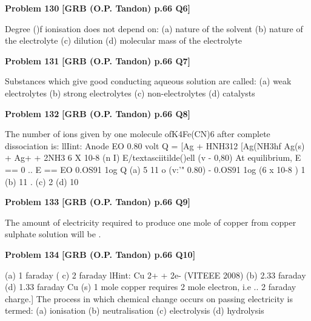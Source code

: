 \begin{problembox}
\textbf{Problem 130} \hfill \textbf{[GRB (O.P. Tandon) p.66 Q6]}
\label{q:ext-grb_all_questions-130}

Degree ()f ionisation does not depend on: 
(a) nature of the solvent 
(b) nature of the electrolyte 
(c) dilution 
(d) molecular mass of the electrolyte
\end{problembox}

\begin{problembox}
\textbf{Problem 131} \hfill \textbf{[GRB (O.P. Tandon) p.66 Q7]}
\label{q:ext-grb_all_questions-131}

Substances which give good conducting aqueous solution are 
called: 
(a) weak electrolytes 
(b) strong electrolytes 
(c) non-electrolytes 
(d) catalysts
\end{problembox}

\begin{problembox}
\textbf{Problem 132} \hfill \textbf{[GRB (O.P. Tandon) p.66 Q8]}
\label{q:ext-grb_all_questions-132}

The number of ions given by one molecule ofK4Fe(CN)6 after 
complete dissociation is: 
llIint: 
Anode 
EO 
0.80 volt 
Q = [Ag + HNH312 
[Ag(NH3hf 
Ag(s) + Ag+ + 2NH3 
6 X 10-8 
(n 
I) 
E/textasciitilde()ell 
(v - 0,80) 
At equilibrium, E == 0 
.. 
E == EO \underline{\hspace{1cm}} 0.OS91 1og Q 
(a) 5 
11 
o (v:'" 0.80) - 0.OS91 1og (6 x 10-8 ) 
1 
(b) 11 
. (c) 2 
(d) 10
\end{problembox}

\begin{problembox}
\textbf{Problem 133} \hfill \textbf{[GRB (O.P. Tandon) p.66 Q9]}
\label{q:ext-grb_all_questions-133}

The amount of electricity required to produce one mole of 
copper from copper sulphate solution will be .
\end{problembox}

\begin{problembox}
\textbf{Problem 134} \hfill \textbf{[GRB (O.P. Tandon) p.66 Q10]}
\label{q:ext-grb_all_questions-134}

(a) 1 faraday 
( c) 2 faraday 
lHint: Cu 2+ + 2e-
(VITEEE 2008) 
(b) 2.33 faraday 
(d) 1.33 faraday 
Cu (s) 
1 mole copper requires 2 mole electron, i.e .. 2 faraday charge.] 
The process in which chemical change occurs on passing 
electricity is termed: 
(a) ionisation 
(b) neutralisation 
(c) electrolysis 
(d) hydrolysis
\end{problembox}

